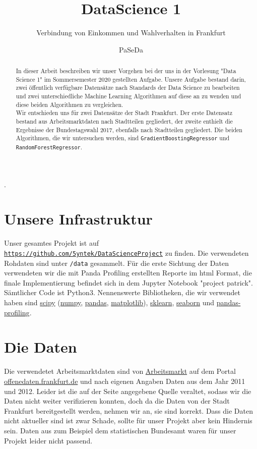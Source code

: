 \documentclass[a4paper,10pt]{scrartcl}
\title{\vspace{2cm} DataScience 1 }
\subtitle{\vspace{4cm}Verbindung von Einkommen  und Wahlverhalten in Frankfurt}
\author{\vspace{5cm}PaSeDa}
\date{}
\begin{document}
\maketitle
\newpage
\begin{abstract}
In dieser Arbeit beschreiben wir unser Vorgehen bei der uns in der Vorlesung  "Data Science 1"  im Sommersemester 2020 gestellten Aufgabe. Unsere Aufgabe bestand darin, zwei öffentlich verfügbare Datensätze nach Standards der Data Science zu bearbeiten und zwei unterschiedliche Machine Learning Algorithmen auf diese an zu wenden und diese beiden Algorithmen zu vergleichen.\\
Wir entschieden uns für zwei Datensätze der Stadt Frankfurt. Der erste Datensatz bestand aus Arbeitsmarktdaten nach Stadtteilen gegliedert, der zweite enthielt die Ergebnisse der Bundestagswahl 2017, ebenfalls nach Stadtteilen gegliedert. Die beiden Algorithmen, die wir untersuchen werden, sind \lstinline|GradientBoostingRegressor| und \lstinline|RandomForestRegressor|. \\
\end{abstract}
\newpage
\tableofcontents
.
\newpage
\section{Unsere Infrastruktur}
Unser gesamtes Projekt ist auf \href{Github}{\lstinline|https://github.com/5yntek/DataScienceProject|} zu finden. Die verwendeten Rohdaten sind unter \lstinline|/data| gesammelt. Für die erste Sichtung der Daten verwendeten wir die mit Panda Profiling erstellten Reporte im html Format, die finale Implementierung befindet sich in dem Jupyter Notebook "project patrick". Sämtlicher Code ist Python3. Nennenswerte Bibliotheken, die wir verwendet haben sind \href{https://www.scipy.org/}{scipy} (\href{https://numpy.org/}{numpy}, \href{https://pandas.pydata.org/}{pandas}, \href{https://matplotlib.org/}{matplotlib}), \href{https://scikit-learn.org/}{sklearn}, \href{https://seaborn.pydata.org/}{seaborn}  und \href{https://github.com/pandas-profiling/pandas-profiling}{pandas-profiling}.


\section{Die Daten}
Die verwendetet Arbeitsmarktdaten sind von \href{https://offenedaten.frankfurt.de/dataset/arbeitsmarkt}{Arbeitsmarkt} auf dem Portal \href{https://offenedaten.frankfurt.de} {offenedaten.frankfurt.de} und  nach eigenen Angaben Daten aus dem Jahr 2011 und 2012. Leider ist die auf der Seite angegebene Quelle veraltet, sodass wir die Daten nicht weiter verifizieren konnten, doch da die Daten von der Stadt Frankfurt bereitgestellt werden, nehmen wir an, sie sind korrekt. Dass die Daten nicht aktueller sind ist zwar Schade, sollte für unser Projekt aber kein Hindernis sein. Daten aus zum Beispiel dem statistischen Bundesamt waren für unser Projekt leider nicht passend. 
\end{document}
